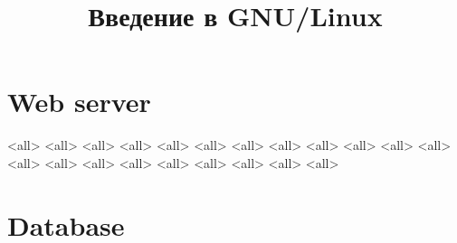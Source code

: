 

\title{Введение в GNU/Linux}




\begin{frame}
	\frametitle{}
	\titlepage
	\vspace{-0.5cm}
	\begin{center}
	\end{center}
\end{frame}


\begin{frame}
	\tableofcontents
	[hideallsubsections]
\end{frame}


\section{Web server}
\mode<all>{}
\mode<all>{}
\mode<all>{}
\mode<all>{}
\mode<all>{}
\mode<all>{}
\mode<all>{}
\mode<all>{}
\mode<all>{}
\mode<all>{}
\mode<all>{}
\mode<all>{}
\mode<all>{}
\mode<all>{}
\mode<all>{}
\mode<all>{}
\mode<all>{}
\mode<all>{}
\mode<all>{}
\mode<all>{}
\mode<all>{}


\section{Database}


